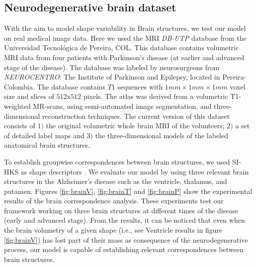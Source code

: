 \documentclass[]{article}
\begin{document}
\subsection{Neurodegenerative brain dataset}

With the aim to model shape variability in Brain structures, we test our model on real medical image data. Here  we used the MRI \textit{DB-UTP} database from the Universidad Tecnol\'ogica de Pereira, COL. This database contains volumetric MRI data from four patients with Parkinson's disease (at earlier and advanced stage of the disease). The database was labeled by neurosurgeons from \textit{NEUROCENTRO}: The Institute of Parkinson and Epilepsy, located in Pereira-Colombia. The database contains $T1$ sequences with $1mm\times1mm\times1mm$ voxel size and slices of $512$x$512$ pixels. The atlas was derived
from a volumetric T1-weighted MR-scans, using semi-automated image segmentation, and three-dimensional reconstruction
techniques. The current version of this dataset consists of $1)$ the original volumetric whole brain MRI of the
volunteers; $2)$ a set of detailed label maps and $3)$ the three-dimensional models of the labeled anatomical brain
structures.

To establish groupwise correspondences between brain structures,  we used SI-HKS as shape descriptors \cite{Bronstein10}. We evaluate our model by using three relevant brain structures in the Alzheimer's disease such as the ventricle, thalamus, and putamen. Figures \ref{fig:brainV}, \ref{fig:brainT} and \ref{fig:brainP} show the experimental results of the brain correspondence analysis. These experiments test our framework working on three brain structures at different times of the disease (early and advanced stage). From the results, it can be noticed that even when the brain volumetry of a given shape (i.e., see Ventricle results in figure \ref{fig:brainV}) has lost part of their mass as consequence of the neurodegenerative process, our model is capable of establishing relevant correspondences between brain structures.
\end{document}
